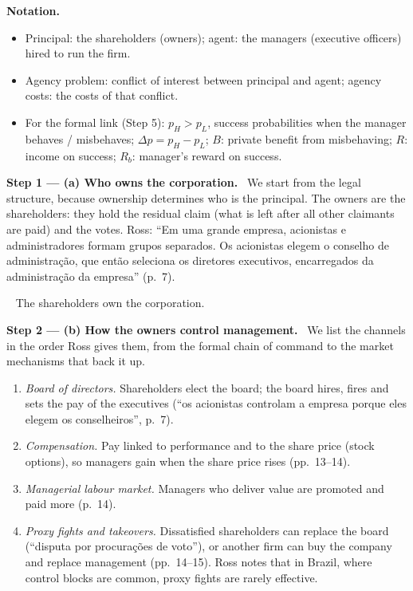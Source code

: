 \documentclass[11pt,a4paper]{article}
\newcommand{\notation}{\par\noindent\textbf{Notation.}}
\newcommand{\step}[2]{\par\medskip\noindent\textbf{Step #1 --- #2.}~}
\newcommand{\pt}{\foreignlanguage{brazilian}}
\newcommand{\answer}[1]{\par\smallskip\noindent\fbox{\textbf{Answer #1.}}~}
\begin{document}
\notation
\begin{itemize}
  \item Principal: the shareholders (owners); agent: the managers (executive officers) hired to run the firm.
  \item Agency problem: conflict of interest between principal and agent; agency costs: the costs of that conflict.
  \item For the formal link (Step 5): $p_H>p_L$, success probabilities when the manager behaves / misbehaves; $\Delta p=p_H-p_L$; $B$: private benefit from misbehaving; $R$: income on success; $R_b$: manager's reward on success.
\end{itemize}

\step{1}{(a) Who owns the corporation} We start from the legal structure, because ownership
determines who is the principal. The owners are the shareholders: they hold the residual claim
(what is left after all other claimants are paid) and the votes. Ross: \pt{``Em uma grande
empresa, acionistas e administradores formam grupos separados. Os acionistas elegem o conselho
de administra\c{c}\~ao, que ent\~ao seleciona os diretores executivos, encarregados da
administra\c{c}\~ao da empresa''} (p.~7).

\answer{(a)} The shareholders own the corporation.

\step{2}{(b) How the owners control management} We list the channels in the order Ross gives
them, from the formal chain of command to the market mechanisms that back it up.
\begin{enumerate}
  \item \emph{Board of directors.} Shareholders elect the board; the board hires, fires and
        sets the pay of the executives (\pt{``os acionistas controlam a empresa porque eles
        elegem os conselheiros''}, p.~7).
  \item \emph{Compensation.} Pay linked to performance and to the share price (stock options),
        so managers gain when the share price rises (pp.~13--14).
  \item \emph{Managerial labour market.} Managers who deliver value are promoted and paid more
        (p.~14).
  \item \emph{Proxy fights and takeovers.} Dissatisfied shareholders can replace the board
        (\pt{``disputa por procura\c{c}\~oes de voto''}), or another firm can buy the company
        and replace management (pp.~14--15). Ross notes that in Brazil, where control blocks are
        common, proxy fights are rarely effective.
\end{enumerate}
\end{document}
